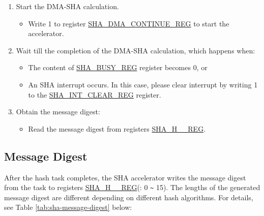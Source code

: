 \documentclass[main\_\_EN.tex]{subfiles}
\begin{document}
\begin{enumerate}
    \item Start the DMA-SHA calculation.
        \begin{itemize}
            \item Write 1 to register \hyperref[regdesc:SHADMACONTINUEREG]{SHA\_DMA\_CONTINUE\_REG} to start the accelerator.
        \end{itemize}

    \item Wait till the completion of the DMA-SHA calculation, which happens when:
        \begin{itemize}
            \item The content of \hyperref[regdesc:SHABUSYREG]{SHA\_BUSY\_REG} register becomes 0, or
            \item An SHA interrupt occurs. In this case, please clear interrupt by writing 1 to the \hyperref[regdesc:SHAINTCLEARREG]{SHA\_INT\_CLEAR\_REG} register.
        \end{itemize}

    \item Obtain the message digest:
    \begin{itemize}
        \item Read the message digest from registers \hyperref[regdesc:SHAHNREG]{SHA\_H\_\_REG}.
    \end{itemize}
\end{enumerate}


\subsection{Message Digest}

After the hash task completes, the SHA accelerator writes the message digest from the task to registers \hyperref[regdesc:SHAHNREG]{SHA\_H\_\_REG}(: 0 \verb+~+ 15). The lengths of the generated message digest are different depending on different hash algorithms. For details, see Table \ref{tab:sha-message-digest} below:
\end{document}
